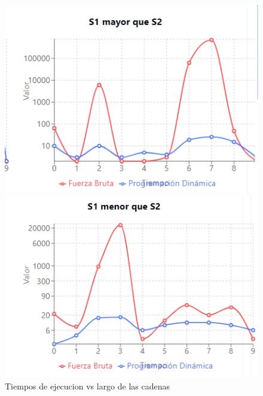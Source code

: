\begin{figure}[H]
    \centering
    \begin{minipage}[t]{0.5\textwidth}
        \includegraphics[width=\textwidth]{images/s1mayor.png}
    \end{minipage}%
    \begin{minipage}[t]{0.5\textwidth}
        \includegraphics[width=\textwidth]{images/s1menor.png}   \end{minipage}%
    \caption{Tiempos de ejecucion vs largo de las cadenas}
    \label{fig:Tiempos de ejecucion vs largo de las cadenas}
\end{figure}
